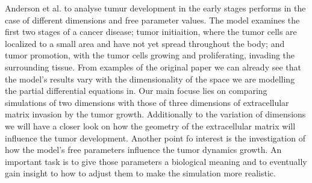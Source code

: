 Anderson et al. \cite{anderson_continuous_1998,anderson_mathematical_2000} to analyse tumur development in the early stages
performs in the case of different dimensions and free parameter values. 
The model examines the first two stages of a cancer disease; tumor initiaition, where 
the tumor cells are localized to a small area and have not yet spread throughout 
the body; and tumor promotion, with the tumor cells growing and proliferating, invading the 
surrounding tissue.
From examples of the original paper we can already see that the model's results vary with the 
dimensionality of the space we are modelling the partial differential equations in. 
Our main focuse lies on comparing simulations of two dimensions with those of three dimensions 
of extracellular matrix invasion by the tumor growth.
Additionally to the variation of dimensions we will have a closer look on how 
the geometry of the extracellular matrix will influence the tumor development. \newline 
Another point fo interest is the investigation of how the model's free parameters influence the 
tumor dynamics growth. An important task is to give those parameters a biological meaning and 
to eventually gain insight to how to adjust them to make the simulation more realistic.